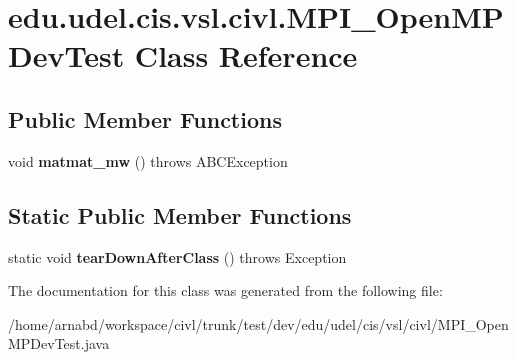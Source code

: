 \hypertarget{classedu_1_1udel_1_1cis_1_1vsl_1_1civl_1_1MPI__OpenMPDevTest}{}\section{edu.\+udel.\+cis.\+vsl.\+civl.\+M\+P\+I\+\_\+\+Open\+M\+P\+Dev\+Test Class Reference}
\label{classedu_1_1udel_1_1cis_1_1vsl_1_1civl_1_1MPI__OpenMPDevTest}
\subsection*{Public Member Functions}
\begin{DoxyCompactItemize}
\item 
\hypertarget{classedu_1_1udel_1_1cis_1_1vsl_1_1civl_1_1MPI__OpenMPDevTest_a7a211d80266f6628bdbe1cdfc255300a}{}void {\bfseries matmat\+\_\+mw} ()  throws A\+B\+C\+Exception \label{classedu_1_1udel_1_1cis_1_1vsl_1_1civl_1_1MPI__OpenMPDevTest_a7a211d80266f6628bdbe1cdfc255300a}

\end{DoxyCompactItemize}
\subsection*{Static Public Member Functions}
\begin{DoxyCompactItemize}
\item 
\hypertarget{classedu_1_1udel_1_1cis_1_1vsl_1_1civl_1_1MPI__OpenMPDevTest_a288600d17ec17f03d8579b2e7617dde6}{}static void {\bfseries tear\+Down\+After\+Class} ()  throws Exception \label{classedu_1_1udel_1_1cis_1_1vsl_1_1civl_1_1MPI__OpenMPDevTest_a288600d17ec17f03d8579b2e7617dde6}

\end{DoxyCompactItemize}


The documentation for this class was generated from the following file\+:\begin{DoxyCompactItemize}
\item 
/home/arnabd/workspace/civl/trunk/test/dev/edu/udel/cis/vsl/civl/M\+P\+I\+\_\+\+Open\+M\+P\+Dev\+Test.\+java\end{DoxyCompactItemize}
